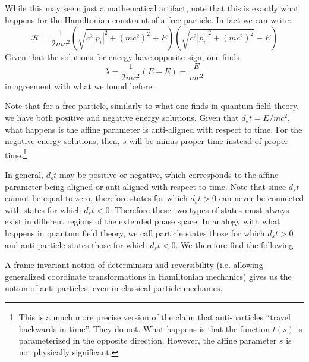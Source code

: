 While this may seem just a mathematical artifact, note that this is exactly what happens for the Hamiltonian constraint of a free particle. In fact we can write:
\begin{equation}
	\mathcal{H} = \frac{1}{2mc^2} (\sqrt{c^2 |p_i|^2 + (mc^2)^2 } + E) (\sqrt{c^2 |p_i|^2 + (mc^2)^2 } - E)
\end{equation}
Given that the solutions for energy have opposite sign, one finds
\begin{equation}
	\lambda = \frac{1}{2mc^2}(E + E) = \frac{E}{mc^2}
\end{equation}
in agreement with what we found before.

Note that for a free particle, similarly to what one finds in quantum field theory, we have both positive and negative energy solutions. Given that $d_s t = E/mc^2$, what happens is the affine parameter is anti-aligned with respect to time. For the negative energy solutions, then, $s$ will be minus proper time instead of proper time.\footnote{This is a much more precise version of the claim that anti-particles ``travel backwards in time''. They do not. What happens is that the function $t(s)$ is parameterized in the opposite direction. However, the affine parameter $s$ is not physically significant.}

In general, $d_s t$ may be positive or negative, which corresponds to the affine parameter being aligned or anti-aligned with respect to time. Note that since $d_s t$ cannot be equal to zero, therefore states for which $d_s t > 0$ can never be connected with states for which $d_s t < 0$. Therefore these two types of states must always exist in different regions of the extended phase space. In analogy with what happens in quantum field theory, we call particle states those for which $d_s t > 0$ and anti-particle states those for which $d_s t < 0$. We therefore find the following
\begin{insight}
	A frame-invariant notion of determinism and reversibility (i.e. allowing generalized coordinate transformations in Hamiltonian mechanics) gives us the notion of anti-particles, even in classical particle mechanics.
\end{insight}


